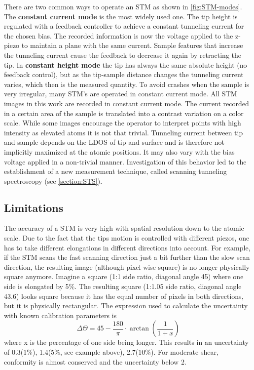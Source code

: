 There are two common ways to operate an STM as shown in \autoref{fig:STM-modes}.
The \textbf{constant current mode} is the most widely used one. The tip height is regulated with a feedback controller to achieve a constant tunneling current for the chosen bias. The recorded information is now the voltage applied to the z-piezo to maintain a plane with the same current. Sample features that increase the tunneling current cause the feedback to decrease it again by retracting the tip.
In \textbf{constant height mode} the tip has always the same absolute height (no feedback control), but as the tip-sample distance changes the tunneling current varies, which then is the measured quantity.
To avoid crashes when the sample is very irregular, many STM's are operated in constant current mode. All STM images in this work are recorded in constant current mode.
The current recorded in a certain area of the sample is translated into a contrast variation on a color scale. While some images encourage the operator to interpret points with high intensity as elevated atoms it is not that trivial. Tunneling current between tip and sample depends on the LDOS of tip and surface and is therefore not implicitly maximized at the atomic positions. It may also vary with the bias voltage applied in a non-trivial manner. Investigation of this behavior led to the establishment of a new measurement technique, called scanning tunneling spectroscopy (see \autoref{section:STS}). 

\subsection{Limitations}The accuracy of a STM is very high with spatial resolution down to the atomic scale. Due to the fact that the tips motion is controlled with different piezos, one has to take different elongations in different directions into account. For example, if the STM scans the fast scanning direction just a bit further than the slow scan direction, the resulting image (although pixel wise square) is no longer physically square anymore. Imagine a square (1:1 side ratio, diagonal angle 45\textdegree) where one side is elongated by 5\%. The resulting square (1:1.05 side ratio, diagonal angle 43.6\textdegree) looks square because it has the equal number of pixels in both directions, but it is physically rectangular. The expression used to calculate the uncertainty with known calibration parameters is
$$\Delta \Theta = 45 - \frac{180}{\pi}\cdot\arctan(\frac{1}{1+x})$$ where x is the percentage of one side being longer. This results in an uncertainty of 0.3\textdegree(1\%), 1.4\textdegree(5\%, see example above), 2.7\textdegree(10\%). For moderate shear, conformity is almost conserved and the uncertainty below 2\textdegree.

